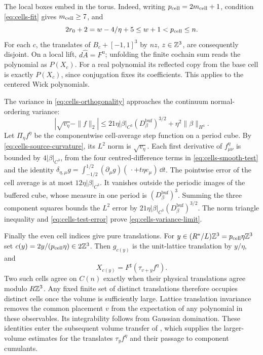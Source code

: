 The local boxes embed in the torus. Indeed, writing
$p_{\rm cell}=2m_{\rm cell}+1$, condition \eqref{eq:cells-fit} gives $m_{\rm cell}\ge7$,
and
\[
 2r_0+2=w-4/\eta+5\le w+1<p_{\rm cell}\le n.
\]
For each $c$, the translates of $B_c+[-1,1]^3$ by
$nz$, $z\in\mathbb Z^3$, are consequently disjoint.
On a local lift, $d\widehat A=F^{\mathrm u}$; unfolding
the finite cochain sum reads the polynomial as $P(X_c)$.
For a real polynomial its reflected copy from the base
cell is exactly $P(X_c)$, since conjugation fixes its
coefficients. This applies to the centered Wick polynomials.

The variance in \eqref{eq:cells-orthogonality} approaches
the continuum normal-ordering variance:
\begin{equation}\label{eq:cells-variance-limit}
 \left|\sqrt{v_\eta}-\|f\|_2\right|
 \le21\eta|\beta|_{C^3}(D_\beta^{\mathrm{buf}})^{3/2}
                      +\eta^2\|\beta\|_{H^4}.
\end{equation}
Let $\Pi_\eta f^\eta$ be the componentwise cell-average step
function on a period cube. By \eqref{eq:cells-source-curvature},
its $L^2$ norm is $\sqrt{v_\eta}$.
Each first derivative of $f^\eta_{\mu\nu}$ is bounded
by $4|\beta|_{C^3}$, from the four centred-difference
terms in \eqref{eq:cells-smooth-test} and the identity
$\delta_{\eta,\mu}g=\int_{-1/2}^{1/2}
(\partial_\mu g)(\,\cdot+t\eta e_\mu)\,\dd t$.
The pointwise error of the cell average is at most
$12\eta|\beta|_{C^3}$. It vanishes outside the periodic
images of the buffered cube, whose measure in one period
is $(D_\beta^{\mathrm{buf}})^3$.
Summing the three component squares bounds the $L^2$
error by $21\eta|\beta|_{C^3}(D_\beta^{\mathrm{buf}})^{3/2}$.
The norm triangle inequality and
\eqref{eq:cells-test-error} prove
\eqref{eq:cells-variance-limit}.

Finally the even cell indices give pure translations.
For $y\in(R^*/L)\mathbb Z^3=p_{\rm cell}\eta\mathbb Z^3$ set
$c(y)=2y/(p_{\rm cell}\eta)\in2\mathbb Z^3$. Then $g_{c(y)}$ is the unit-lattice
translation by $y/\eta$, and
\begin{equation}\label{eq:cells-translation-observable}
 X_{c(y)}=F^\sharp(\tau_{v+y}f^\eta).
\end{equation}
Two such cells agree on $C(n)$ exactly when their physical
translations agree modulo $R\mathbb Z^3$. Any fixed finite set
of distinct translations therefore occupies distinct
cells once the volume is sufficiently large.
Lattice translation invariance removes the common placement
$v$ from the expectation of any polynomial in these
observables. Its integrability follows from Gaussian
domination. These identities enter the subsequent volume transfer of
\cite[Theorem~A]{VolumeTransfer}, which supplies the larger-volume estimates
for the translates $\tau_yf^\eta$ and their passage to component cumulants.


